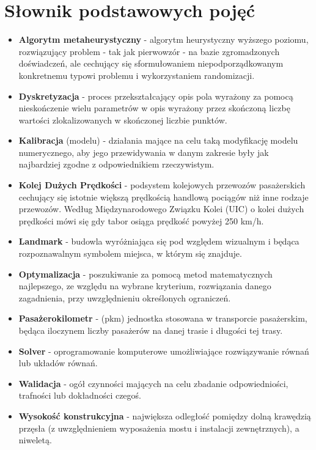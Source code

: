 \section*{Słownik podstawowych pojęć}
\begin{itemize}[label = {},leftmargin=0pt]
\item \textbf{Algorytm metaheurystyczny} - algorytm heurystyczny wyższego poziomu, rozwiązujący problem - tak jak pierwowzór - na bazie zgromadzonych doświadczeń, ale cechujący się sformułowaniem niepodporządkowanym konkretnemu typowi problemu i wykorzystaniem randomizacji. 
\item \textbf{Dyskretyzacja} - proces przekształcający opis pola wyrażony za pomocą nieskończenie wielu parametrów w opis wyrażony przez skończoną liczbę wartości zlokalizowanych w skończonej liczbie punktów.
\item \textbf{Kalibracja} (modelu) - działania mające na celu taką modyfikację modelu numerycznego, aby jego przewidywania w danym zakresie były jak najbardziej zgodne z odpowiednikiem rzeczywistym.
\item \textbf{Kolej Dużych Prędkości} - podsystem kolejowych przewozów pasażerskich cechujący się istotnie większą prędkością handlową pociągów niż inne rodzaje przewozów. Według Międzynarodowego Związku Kolei (UIC) o kolei dużych prędkości mówi się gdy tabor osiąga prędkość powyżej 250 km/h.
\item \textbf{Landmark} - budowla wyróżniająca się pod względem wizualnym i będąca rozpoznawalnym symbolem miejsca, w którym się znajduje.
\item \textbf{Optymalizacja} - poszukiwanie za pomocą metod matematycznych najlepszego, ze względu na wybrane kryterium, rozwiązania danego zagadnienia, przy uwzględnieniu określonych ograniczeń.
\item \textbf{Pasażerokilometr} - (pkm) jednostka stosowana w transporcie pasażerskim, będąca iloczynem liczby pasażerów na danej trasie i długości tej trasy.
\item \textbf{Solver} - oprogramowanie komputerowe umożliwiające rozwiązywanie równań lub układów równań.
\item \textbf{Walidacja} - ogół czynności mających na celu zbadanie odpowiedniości, trafności lub dokładności czegoś.
\item \textbf{Wysokość konstrukcyjna} - największa odległość pomiędzy dolną krawędzią przęsła (z uwzględnieniem wyposażenia mostu i instalacji zewnętrznych), a niweletą.

\end{itemize}
\vfill
\pagebreak[4]

